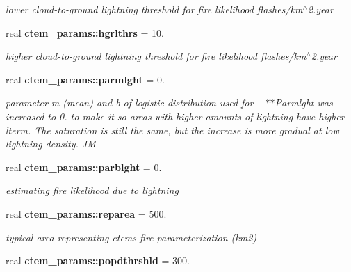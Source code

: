 \begin{DoxyCompactItemize}
\begin{DoxyCompactList}\small\item\em lower cloud-\/to-\/ground lightning threshold for fire likelihood flashes/km$^\wedge$2.year \end{DoxyCompactList}\item 
\hypertarget{namespacectem__params_a2ec617391422478c2c13c4215060b759}{}real {\bfseries ctem\+\_\+params\+::hgrlthrs} = 10.\label{namespacectem__params_a2ec617391422478c2c13c4215060b759}

\begin{DoxyCompactList}\small\item\em higher cloud-\/to-\/ground lightning threshold for fire likelihood flashes/km$^\wedge$2.year \end{DoxyCompactList}\item 
\hypertarget{namespacectem__params_a689825245070f06cb1156044940af148}{}real {\bfseries ctem\+\_\+params\+::parmlght} = 0.\label{namespacectem__params_a689825245070f06cb1156044940af148}

\begin{DoxyCompactList}\small\item\em parameter m (mean) and b of logistic distribution used for ~\newline
$\ast$$\ast$\+Parmlght was increased to 0. to make it so areas with higher amounts of lightning have higher lterm. The saturation is still the same, but the increase is more gradual at low lightning density. J\+M \end{DoxyCompactList}\item 
\hypertarget{namespacectem__params_a1b407a06b92feb424b8338ff8c19e966}{}real {\bfseries ctem\+\_\+params\+::parblght} = 0.\label{namespacectem__params_a1b407a06b92feb424b8338ff8c19e966}

\begin{DoxyCompactList}\small\item\em estimating fire likelihood due to lightning \end{DoxyCompactList}\item 
\hypertarget{namespacectem__params_a7f4c73f924960839ad06590397b9855b}{}real {\bfseries ctem\+\_\+params\+::reparea} = 500.\label{namespacectem__params_a7f4c73f924960839ad06590397b9855b}

\begin{DoxyCompactList}\small\item\em typical area representing ctem\textquotesingle{}s fire parameterization (km2) \end{DoxyCompactList}\item 
\hypertarget{namespacectem__params_a0a275d244526015c0b2ea9dc397c2256}{}real {\bfseries ctem\+\_\+params\+::popdthrshld} = 300.\label{namespacectem__params_a0a275d244526015c0b2ea9dc397c2256}


\end{DoxyCompactItemize}

